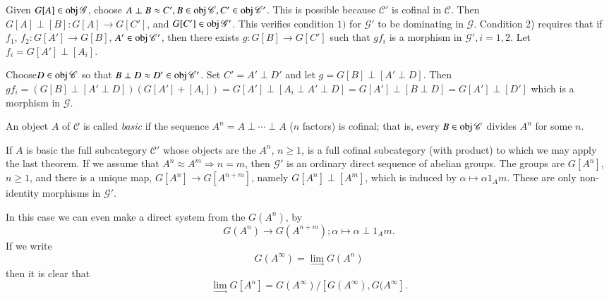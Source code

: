 Given $G[A] \in \operatorname{obj} \mathscr{G}$, choose $A \perp B \approx C', B
\in \operatorname{obj} \mathscr{C}, C' \in \operatorname{obj} \mathscr{C}'$. This is possible
because $\mathscr{C}'$ is cofinal in $\mathscr{C}$. Then $G[A] \perp
[B] : G [A] \to G[C']$, and $G[C'] \in \operatorname{obj} \mathscr{G}'$. This
verifies condition $1)$ for $\mathscr{G}'$ to be dominating in
$\mathscr{G}$. Condition 2) requires that if $f_1$, $f_2 : G[A'] \to
G[B]$, $A' \in \operatorname{obj} \mathscr{C}'$, then there exists $g: G[B] \to
G[C']$ such that $gf_i$ is a morphism in $\mathscr{G}', i = 1,2$. Let
$f_i = G[A'] \perp [A_i]$. 

Choose\pageoriginale $D \in \operatorname{obj} \mathscr{C}$ so that $B \perp D
\approx D' \in \operatorname{obj} 
\mathscr{C}'$. Set $C' = A' \perp D'$ and let $g = G[B] \perp [A'
  \perp D]$. Then $gf_i = (G [B] \perp [A' \perp D]) (G[A'] + [A_i]) =
G[A'] \perp[A_i \perp A' \perp D] = G[A'] \perp [B \perp D]= G[A']
\perp [D']$ which is a morphism in $\mathscr{G}$. 

\begin{defi*}%
An object $A$ of $\mathscr{C}$ is called \textit{basic} if the
sequence $A^n = A \perp \cdots \perp A$ ($n$ factors) is cofinal; that
is, every $B \in \operatorname{obj} \mathscr{C}$ divides $A^n$ for some $n$. 
\end{defi*} 

If $A$ is basic the full subcategory $\mathscr{C}'$ whose objects are
the $A^n$, $n \geq 1$, is a full cofinal subcategory (with product) to
which we may apply the last theorem. If we assume that $A^n \approx
A^m \Longrightarrow n = m$, then $\mathscr{G}'$ is an ordinary direct
sequence of abelian groups. The groups are $G[A^n]$, $n \geq 1$, and
there is a unique map, $G[A^n] \to G[A^{n+m}]$, namely $G[A^n] \perp
[A^m]$, which is induced by $\alpha \mapsto \alpha 1_{A}m$. These are
only non-identity morphisms in $\mathscr{G}'$. 

In this case we can even make a direct system from the $G(A^n)$, by  
$$
G(A^n) \to G(A^{n+m}) ; \alpha \mapsto \alpha \perp 1_{A}m.
$$
If we write
$$
G(A^{\infty}) = \lim \limits_{\to} G(A^n)
$$
then it is clear that
$$
\lim \limits_{\to} G[A^n] = G(A^{\infty}) / [G(A^{\infty}), G(A^{\infty}].
$$


